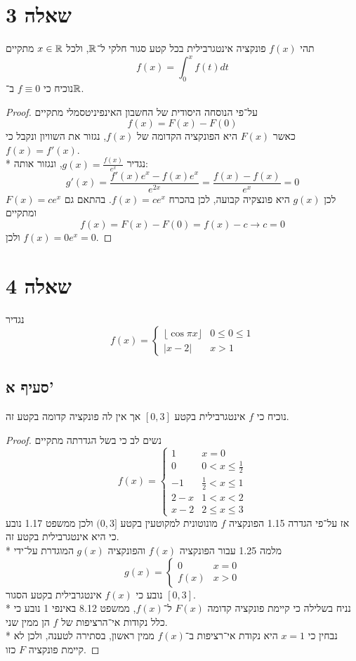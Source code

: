\section{שאלה 3}
תהי $f(x)$ פונקציה אינטגרבילית בכל קטע סגור חלקי ל־$\mathbb{R}$, ולכל $x \in \mathbb{R}$ מתקיים
\[
	f(x) = \int_0^x f(t) dt
\]
נוכיח כי $f \equiv 0$ ב־$\mathbb{R}$.
\begin{proof}
	על־פי הנוסחה היסודית של החשבון האינפיניטסמלי מתקיים
	\[
		f(x) = F(x) - F(0)
	\]
	כאשר $F(x)$ היא הפונקציה הקדומה של $f(x)$, נגזור את השוויון ונקבל כי $f(x) = f'(x)$. \\*
	נגדיר $g(x) = \frac{f(x)}{e^x}$, ונגזור אותה:
	\[
		g'(x) = \frac{f'(x) e^x - f(x) e^x}{e^{2x}} = \frac{f(x) - f(x)}{e^x} = 0
	\]
	לכן $g(x)$ היא פונצקיה קבועה, לכן בהכרח $f(x) = c e^x$. בהתאם גם $F(x) = c e^x$ ומתקיים
	\[
		f(x) = F(x) - F(0) = f(x) - c \rightarrow c = 0
	\]
	ולכן $f(x) = 0 e^x = 0$.
\end{proof}

\section{שאלה 4}
נגדיר
\[
	f(x) = \begin{cases}
		\lfloor \cos \pi x \rfloor & 0 \le 0 \le 1 \\
		\lvert x - 2 \rvert & x > 1
	\end{cases}
\]

\subsection{סעיף א'}
נוכיח כי $f$ אינטגרבילית בקטע $[0, 3]$ אך אין לה פונקציה קדומה בקטע זה.
\begin{proof}
	נשים לב כי בשל הגדרתה מתקיים
	\[
		f(x) = \begin{cases}
			1 & x = 0 \\
			0 & 0 < x \le \frac{1}{2} \\
			-1 & \frac{1}{2} < x \le 1 \\
			2 - x & 1 < x < 2 \\
			x - 2 & 2 \le x \le 3
		\end{cases}
	\]
	אז על־פי הגדרה 1.15 הפונקציה $f$ מונוטונית למקוטעין בקטע $(0, 3]$ ולכן ממשפט 1.17 נובע כי היא אינטגרבילית בקטע זה. \\* %
	מלמה 1.25 עבור הפונקציה $f(x)$ והפונקציה $g(x)$ המוגדרת על־ידי
	\[
		g(x) = \begin{cases}
			0 & x = 0 \\
			f(x) & x > 0
		\end{cases}
	\]
	נובע כי $f(x)$ אינטגרבילית בקטע הסגור $[0, 3]$. \\*
	נניח בשלילה כי קיימת פונקציה קדומה $F(x)$ ל־$f(x)$, ממשפט 8.12 באינפי 1 נובע כי כלל נקודות אי־הרציפות של $f$ הן ממין שני. \\*
	נבחין כי $x = 1$ היא נקודת אי־רציפות ב־$f(x)$ ממין ראשון, בסתירה לטענה, ולכן לא קיימת פונקציה $F$ כזו.
\end{proof}

